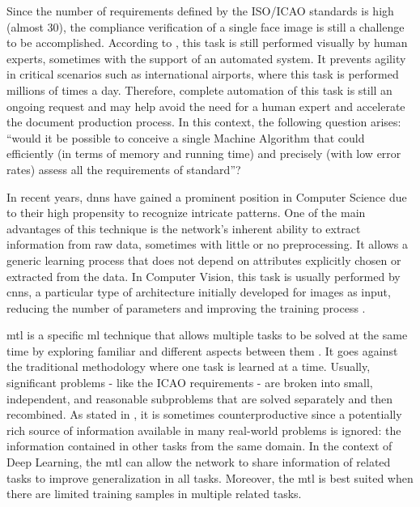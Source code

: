 Since the number of requirements defined by the ISO/ICAO standards is high (almost 30), the compliance verification of a single face image is still a challenge to be accomplished. According to \cite{ferrara2012multi}, this task is still performed visually by human experts, sometimes with the support of an automated system. It prevents agility in critical scenarios such as international airports, where this task is performed millions of times a day. Therefore, complete automation of this task is still an ongoing request and may help avoid the need for a human expert and accelerate the document production process. In this context, the following question arises: ``would it be possible to conceive a single Machine Algorithm that could efficiently (in terms of memory and running time) and precisely (with low error rates) assess all the requirements of \icao standard''?

In recent years, \acfp{dnn} have gained a prominent position in Computer Science due to their high propensity to recognize intricate patterns. One of the main advantages of this technique is the network's inherent ability to extract information from raw data, sometimes with little or no preprocessing. It allows a generic learning process that does not depend on attributes explicitly chosen or extracted from the data. In Computer Vision, this task is usually performed by \acfp{cnn}, a particular type of architecture initially developed for images as input, reducing the number of parameters and improving the training process \citep{goodfellow2016deep}.

\acf{mtl} is a specific \acl{ml} technique that allows multiple tasks to be solved at the same time by exploring familiar and different aspects between them \citep{zhang2017survey}. It goes against the traditional methodology where one task is learned at a time. Usually, significant problems - like the ICAO requirements - are broken into small, independent, and reasonable subproblems that are solved separately and then recombined. As stated in \cite{Caruana1997}, it is sometimes counterproductive since a potentially rich source of information available in many real-world problems is ignored: the information contained in other tasks from the same domain. In the context of Deep Learning, the \acs{mtl} can allow the network to share information of related tasks to improve generalization in all tasks. Moreover, the \acl{mtl} is best suited when there are limited training samples in multiple related tasks.

